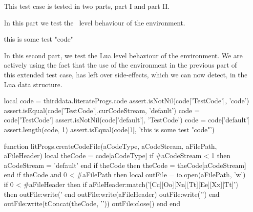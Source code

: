 
This test case is tested in two parts, part I and part II.

In this part we test the \ConTeXt\ level behaviour of the  
environment. 

\startConTest
\begingroup
  \startTestCode
    this is some test "code"
  \stopTestCode
\endgroup
\stopConTest
\stopTestCase


In this second part, we test the Lua level behaviour of the 
 environment. We are actively using the fact that the use 
of the  environment in the previous part of this extended 
test case, has left over side-effects, which we can now detect, in the Lua 
 data structure. 

\startLuaTest
  local code = thirddata.literateProgs.code
  assert.isNotNil(code['TestCode'], 'code')
  assert.isEqual(code['TestCode'].curCodeStream, 'default')
  code = code['TestCode']
  assert.isNotNil(code['default'], 'TestCode')
  code = code['default']
  assert.length(code, 1)
  assert.isEqual(code[1], 'this is some test "code"')
\stopLuaTest
\stopTestCase

\startLuaCode
function litProgs.createCodeFile(aCodeType,
                                 aCodeStream,
                                 aFilePath,
                                 aFileHeader)
  local theCode = code[aCodeType]
  if #aCodeStream < 1 then aCodeStream = 'default' end
  if theCode then theCode = theCode[aCodeStream] end
  if theCode and 0 < #aFilePath then
    local outFile = io.open(aFilePath, 'w')
    if 0 < #aFileHeader then
      if aFileHeader:match('[Cc][Oo][Nn][Tt][Ee][Xx][Tt]') then
        outFile:write('%
      end
      outFile:write(aFileHeader)
      outFile:write('\n\n')
    end
    outFile:write(tConcat(theCode, '\n\n'))
    outFile:close()
  end
end
\stopLuaCode

\stopTestSuite

\startMkIVCode
{}

\setLitProgsOriginMarker[MkIVCode][markMkIVCodeOrigin]
\setLitProgsOriginMarker[LuaCode][markLuaCodeOrigin]
\setLitProgsOriginMarker[LuaTemplate][markLuaTemplateOrigin]
\setLitProgsOriginMarker[CHeader][markCHeaderOrigin]
\setLitProgsOriginMarker[CCode][markCCodeOrigin]
\stopMkIVCode

